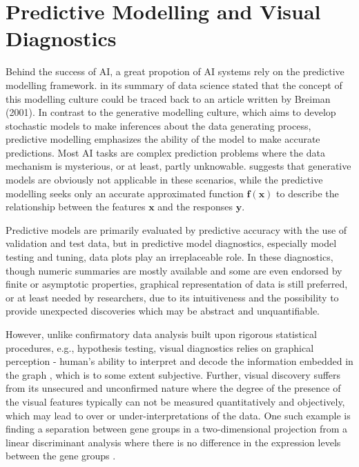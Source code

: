 \documentclass{monashthesis}
\begin{document}
\hypertarget{predictive-modelling-and-visual-diagnostics}{%
\section{Predictive Modelling and Visual Diagnostics}\label{predictive-modelling-and-visual-diagnostics}}

Behind the success of AI, a great propotion of AI systems rely on the predictive modelling framework. \textcite{donoho_50_2017} in its summary of data science stated that the concept of this modelling culture could be traced back to an article written by Breiman (2001). In contrast to the generative modelling culture, which aims to develop stochastic models to make inferences about the data generating process, predictive modelling emphasizes the ability of the model to make accurate predictions. Most AI tasks are complex prediction problems where the data mechanism is mysterious, or at least, partly unknowable. \textcite{breiman_statistical_2001} suggests that generative models are obviously not applicable in these scenarios, while the predictive modelling seeks only an accurate approximated function \(\boldsymbol{f}(\boldsymbol{x})\) to describe the relationship between the features \(\boldsymbol{x}\) and the responses \(\boldsymbol{y}\).

Predictive models are primarily evaluated by predictive accuracy with the use of validation and test data, but in predictive model diagnostics, especially model testing and tuning, data plots play an irreplaceable role. In these diagnostics, though numeric summaries are mostly available and some are even endorsed by finite or asymptotic properties, graphical representation of data is still preferred, or at least needed by researchers, due to its intuitiveness and the possibility to provide unexpected discoveries which may be abstract and unquantifiable.

However, unlike confirmatory data analysis built upon rigorous statistical procedures, e.g., hypothesis testing, visual diagnostics relies on graphical perception - human's ability to interpret and decode the information embedded in the graph \autocite{cleveland_graphical_1984}, which is to some extent subjective. Further, visual discovery suffers from its unsecured and unconfirmed nature where the degree of the presence of the visual features typically can not be measured quantitatively and objectively, which may lead to over or under-interpretations of the data. One such example is finding a separation between gene groups in a two-dimensional projection from a linear discriminant analysis where there is no difference in the expression levels between the gene groups \autocite{roy_chowdhury_using_2015}.
\end{document}
